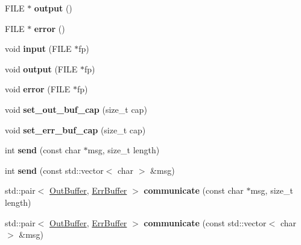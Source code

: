 \begin{DoxyCompactItemize}
F\+I\+LE $\ast$ {\bfseries output} ()
\item 
\mbox{\label{classsubprocess_1_1detail_1_1Streams_a7fa6a4bf256d5a79808a51d77e93a070}} 
F\+I\+LE $\ast$ {\bfseries error} ()
\item 
\mbox{\label{classsubprocess_1_1detail_1_1Streams_a6309a4382e5f553ccdbb86646b2edf2e}} 
void {\bfseries input} (F\+I\+LE $\ast$fp)
\item 
\mbox{\label{classsubprocess_1_1detail_1_1Streams_af057a5301d763a38e0593da7b895a386}} 
void {\bfseries output} (F\+I\+LE $\ast$fp)
\item 
\mbox{\label{classsubprocess_1_1detail_1_1Streams_a139902096905553599251ff3c88196b2}} 
void {\bfseries error} (F\+I\+LE $\ast$fp)
\item 
\mbox{\label{classsubprocess_1_1detail_1_1Streams_a15f9bc130891faca96c895be6d9f14b6}} 
void {\bfseries set\+\_\+out\+\_\+buf\+\_\+cap} (size\+\_\+t cap)
\item 
\mbox{\label{classsubprocess_1_1detail_1_1Streams_a4009b0b094dd757d7855112a342fe21a}} 
void {\bfseries set\+\_\+err\+\_\+buf\+\_\+cap} (size\+\_\+t cap)
\item 
\mbox{\label{classsubprocess_1_1detail_1_1Streams_ac14ae80f99f82b9a5c7fcf4751a263bf}} 
int {\bfseries send} (const char $\ast$msg, size\+\_\+t length)
\item 
\mbox{\label{classsubprocess_1_1detail_1_1Streams_a0dcc7771d6f78d513c2618cc506581f0}} 
int {\bfseries send} (const std\+::vector$<$ char $>$ \&msg)
\item 
\mbox{\label{classsubprocess_1_1detail_1_1Streams_afd5efc8cdde937c4c8f64b59203546ef}} 
std\+::pair$<$ \hyperlink{classsubprocess_1_1Buffer}{Out\+Buffer}, \hyperlink{classsubprocess_1_1Buffer}{Err\+Buffer} $>$ {\bfseries communicate} (const char $\ast$msg, size\+\_\+t length)
\item 
\mbox{\label{classsubprocess_1_1detail_1_1Streams_ae144230818f582c3680a13540175121f}} 
std\+::pair$<$ \hyperlink{classsubprocess_1_1Buffer}{Out\+Buffer}, \hyperlink{classsubprocess_1_1Buffer}{Err\+Buffer} $>$ {\bfseries communicate} (const std\+::vector$<$ char $>$ \&msg)
\end{DoxyCompactItemize}
